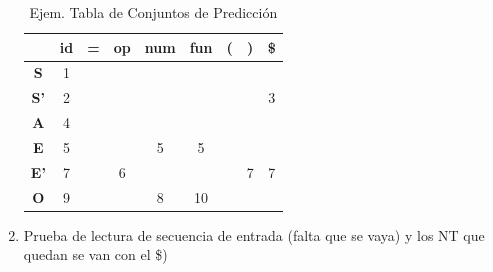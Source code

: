 \documentclass[12pt, twoside, openright]{report} %
\begin{document}
\begin{enumerate}
	      \begin{table}[H]
		      \centering
		      \begin{tabular}{c|c|c|c|c|c|c|c|c|}
			                  & \textbf{id} & \textbf{=} & \textbf{op} & \textbf{num} & \textbf{fun} & \textbf{(} & \textbf{)} & \textbf{\$} \\ \hline
			      \textbf{S}  & 1           &            &             &              &              &            &            &             \\ \hline
			      \textbf{S'} & 2           &            &             &              &              &            &            & 3           \\ \hline
			      \textbf{A}  & 4           &            &             &              &              &            &            &             \\ \hline
			      \textbf{E}  & 5           &            &             & 5            & 5            &            &            &             \\ \hline
			      \textbf{E'} & 7           &            & 6           &              &              &            & 7          & 7           \\ \hline
			      \textbf{O}  & 9           &            &             & 8            & 10           &            &            &             \\ \hline
		      \end{tabular}
		      \caption{Ejem. Tabla de Conjuntos de Predicción}
	      \end{table}
	      \pagebreak
	\item Prueba de lectura de secuencia de entrada (falta que se vaya) y los
	      NT que quedan se van con el \$)


\end{enumerate}
\end{document}
